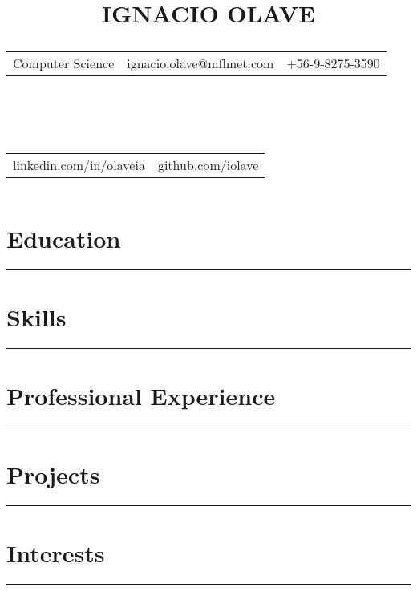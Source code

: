\documentclass[letterpaper]{article}
\title{
    {\fontsize{18}{1}\selectfont \textbf{IGNACIO OLAVE}}\\
    {\fontsize{14}{1}\selectfont\textcolor{grey-1}{
        \begin{tabular}{l|l|l}
            Computer Science & ignacio.olave@mfhnet.com & +56-9-8275-3590
        \end{tabular}
    }}\\
    {\fontsize{12}{1}\selectfont\textcolor{grey-2}{
        \begin{tabular}{l|l}
            linkedin.com/in/olaveia & github.com/iolave
        \end{tabular}
    }}
}
\author{\vspace{-5ex}}
\date{\vspace{-5ex}}
\begin{document}
    \maketitle
    \section*{Education}
        \noindent\rule{\textwidth}{0.3pt}

    \section*{Skills}
        \noindent\rule{\textwidth}{0.3pt}

    \section*{Professional Experience}
        \noindent\rule{\textwidth}{0.3pt}

    \section*{Projects}
        \noindent\rule{\textwidth}{0.3pt}

    \section*{Interests}
        \noindent\rule{\textwidth}{0.3pt}
\end{document}
